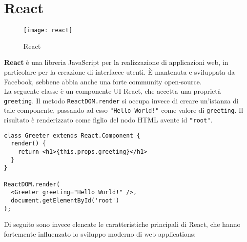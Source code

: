\section{React}

\begin{figure}[H] 
  \centering 
  \texttt{[image: react]} 
  \caption{React}
\end{figure}

\textbf{React} è una libreria JavaScript per la realizzazione di applicazioni web, in particolare per la creazione di interfacce utenti. È mantenuta e sviluppata da Facebook, sebbene abbia anche una forte community open-source. \\

La seguente classe è un componente UI React, che accetta una proprietà \texttt{greeting}. Il metodo \texttt{ReactDOM.render} si occupa invece di creare un'istanza di tale componente, passando ad esso \texttt{"Hello World!"} come valore di \texttt{greeting}. Il risultato è renderizzato come figlio del nodo HTML avente id \texttt{"root"}. \\

\begin{lstlisting}[language={[Sharp]C},basicstyle=\footnotesize]
class Greeter extends React.Component { 
  render() { 
    return <h1>{this.props.greeting}</h1>
  } 
} 

ReactDOM.render(
  <Greeter greeting="Hello World!" />,
  document.getElementById('root')
);
\end{lstlisting}

Di seguito sono invece elencate le caratteristiche principali di React, che hanno fortemente influenzato lo sviluppo moderno di web applications:

